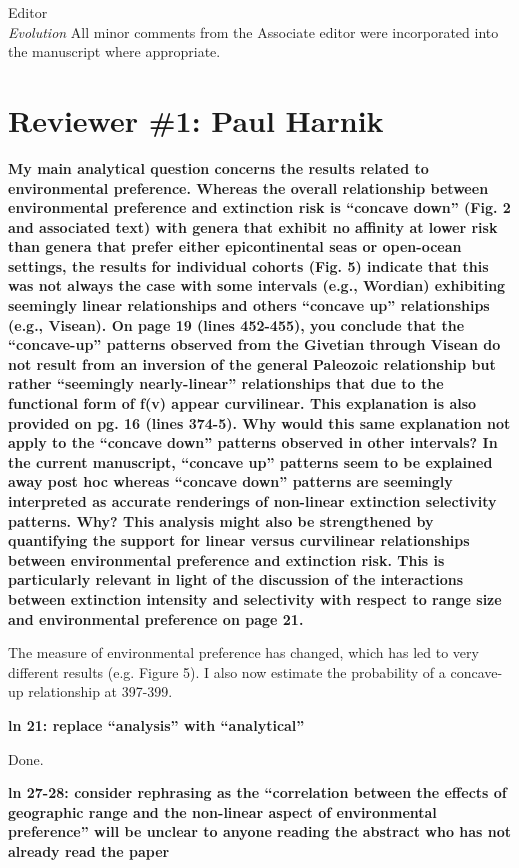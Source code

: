 \documentclass{letter}
\begin{document}
\begin{letter}{Editor \\ \textit{Evolution}}
  All minor comments from the Associate editor were incorporated into the manuscript where appropriate.
 
  \section{Reviewer \#1: Paul Harnik}
  \textbf{My main analytical question concerns the results related to environmental preference. Whereas the overall relationship between environmental preference and extinction risk is “concave down” (Fig. 2 and associated text) with genera that exhibit no affinity at lower risk than genera that prefer either epicontinental seas or open-ocean settings, the results for individual cohorts (Fig. 5) indicate that this was not always the case with some intervals (e.g., Wordian) exhibiting seemingly linear relationships and others “concave up” relationships (e.g., Visean). On page 19 (lines 452-455), you conclude that the “concave-up” patterns observed from the Givetian through Visean do not result from an inversion of the general Paleozoic relationship but rather “seemingly nearly-linear” relationships that due to the functional form of f(v) appear curvilinear. This explanation is also provided on pg. 16 (lines 374-5). Why would this same explanation not apply to the “concave down” patterns observed in other intervals? In the current manuscript, “concave up” patterns seem to be explained away post hoc whereas “concave down” patterns are seemingly interpreted as accurate renderings of non-linear extinction selectivity patterns. Why? This analysis might also be strengthened by quantifying the support for linear versus curvilinear relationships between environmental preference and extinction risk. This is particularly relevant in light of the discussion of the interactions between extinction intensity and selectivity with respect to range size and environmental preference on page 21.}

  The measure of environmental preference has changed, which has led to very different results (e.g. Figure 5). I also now estimate the probability of a concave-up relationship at 397-399.

  \textbf{ln 21: replace “analysis” with “analytical”}

  Done.

  \textbf{ln 27-28: consider rephrasing as the “correlation between the effects of geographic range and the non-linear aspect of environmental preference” will be unclear to anyone reading the abstract who has not already read the paper}


\end{letter}
\end{document}
